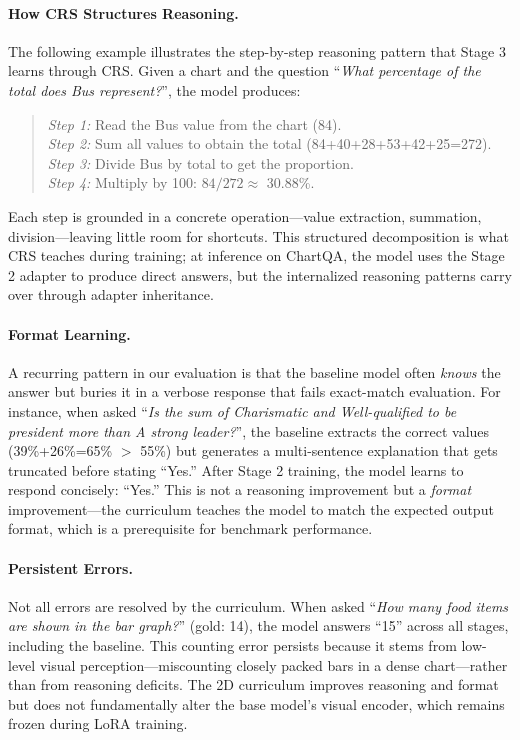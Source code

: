 \documentclass[journal]{IEEEtran}
\newcommand{\crs}{CRS}
\begin{document}
\paragraph{How \crs{} Structures Reasoning.}
The following example illustrates the step-by-step reasoning pattern that Stage 3 learns through \crs{}. Given a chart and the question ``\textit{What percentage of the total does Bus represent?}'', the model produces:
\begin{small}
\begin{quote}
\textit{Step 1:} Read the Bus value from the chart (84). \\
\textit{Step 2:} Sum all values to obtain the total (84+40+28+53+42+25=272). \\
\textit{Step 3:} Divide Bus by total to get the proportion. \\
\textit{Step 4:} Multiply by 100: $84/272 \approx$ 30.88\%.
\end{quote}
\end{small}
Each step is grounded in a concrete operation---value extraction, summation, division---leaving little room for shortcuts. This structured decomposition is what \crs{} teaches during training; at inference on ChartQA, the model uses the Stage 2 adapter to produce direct answers, but the internalized reasoning patterns carry over through adapter inheritance.

\paragraph{Format Learning.}
A recurring pattern in our evaluation is that the baseline model often \emph{knows} the answer but buries it in a verbose response that fails exact-match evaluation. For instance, when asked ``\textit{Is the sum of Charismatic and Well-qualified to be president more than A strong leader?}'', the baseline extracts the correct values (39\%+26\%=65\% $>$ 55\%) but generates a multi-sentence explanation that gets truncated before stating ``Yes.'' After Stage 2 training, the model learns to respond concisely: ``Yes.'' This is not a reasoning improvement but a \emph{format} improvement---the curriculum teaches the model to match the expected output format, which is a prerequisite for benchmark performance.

\paragraph{Persistent Errors.}
Not all errors are resolved by the curriculum. When asked ``\textit{How many food items are shown in the bar graph?}'' (gold: 14), the model answers ``15'' across all stages, including the baseline. This counting error persists because it stems from low-level visual perception---miscounting closely packed bars in a dense chart---rather than from reasoning deficits. The 2D curriculum improves reasoning and format but does not fundamentally alter the base model's visual encoder, which remains frozen during LoRA training.
\end{document}
